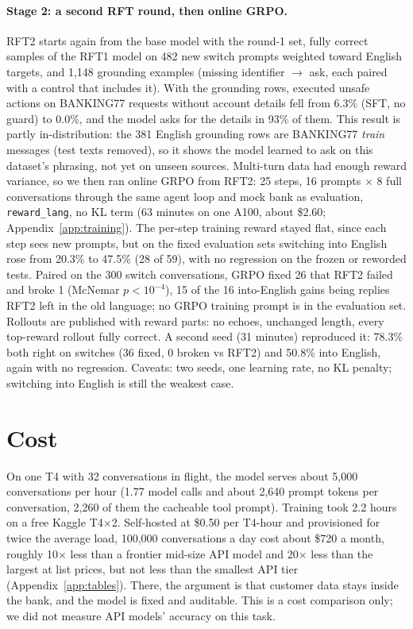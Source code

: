 \documentclass[11pt]{article}
\newcommand{\tool}[1]{\texttt{\small #1}}
\begin{document}
\paragraph{Stage 2: a second RFT round, then online GRPO.} RFT2 starts again from the base model with the round-1
set, fully correct samples of the RFT1 model on 482 new switch prompts weighted toward English targets, and 1,148
grounding examples (missing identifier $\rightarrow$ ask, each paired with a control that includes it). With the
grounding rows, executed unsafe actions on BANKING77 requests without account details fell from 6.3\% (SFT, no
guard) to 0.0\%, and the model asks for the details in 93\% of them. This result is partly in-distribution: the 381
English grounding rows are BANKING77 \emph{train} messages (test texts removed), so it shows the model learned to ask on
this dataset's phrasing, not yet on unseen sources. Multi-turn data had enough reward variance,
so we then ran online GRPO \citep{shao2024deepseekmath} from RFT2: 25 steps, 16 prompts $\times$ 8 full
conversations through the same agent loop and mock bank as evaluation, \tool{reward\_lang}, no KL term (63 minutes on
one A100, about \$2.60; Appendix~\ref{app:training}). The per-step training reward stayed flat, since each step sees
new prompts, but on the fixed evaluation sets switching into English rose from 20.3\% to 47.5\% (28 of 59), with no
regression on the frozen or reworded tests. Paired on the 300 switch conversations, GRPO fixed 26 that RFT2 failed and broke 1 (McNemar $p<10^{-4}$), 15 of
the 16 into-English gains being replies RFT2 left in the old language; no GRPO training prompt is in the evaluation set.
Rollouts are published with reward parts: no echoes, unchanged length, every top-reward rollout fully correct. A second seed (31 minutes) reproduced it: 78.3\% both right on switches (36 fixed, 0 broken vs RFT2) and 50.8\% into English, again with no regression. Caveats: two seeds, one learning rate, no KL penalty; switching into English
is still the weakest case.

\section{Cost}

On one T4 with 32 conversations in flight, the model serves about 5,000 conversations per hour (1.77 model calls and
about 2,640 prompt tokens per conversation, 2,260 of them the cacheable tool prompt). Training took 2.2 hours on a
free Kaggle T4$\times$2. Self-hosted at \$0.50 per T4-hour and provisioned for twice the average load, 100,000
conversations a day cost about \$720 a month, roughly 10$\times$ less than a frontier mid-size API model and
20$\times$ less than the largest at list prices, but not less than the smallest API tier (Appendix~\ref{app:tables}).
There, the argument is that customer data stays inside the bank, and the model is fixed and auditable. This is a
cost comparison only; we did not measure API models' accuracy on this task.
\end{document}
